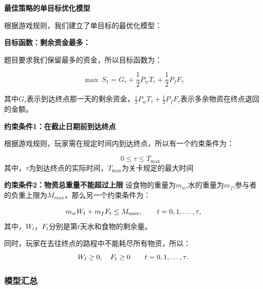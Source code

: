 \noindent{} \textbf{最佳策略的单目标优化模型}

根据游戏规则，我们建立了单目标的最优化模型：

\textbf{目标函数：剩余资金最多：}

题目要求我们保留最多的资金，所以目标函数为：

\[
\max \ S_1
=G_{\tau}+\frac{1}{2}P_wT_{\tau}+\frac{1}{2}P_fF_{\tau}
\]

其中$G_{\tau}$表示到达终点那一天的剩余资金，$\frac{1}{2}P_wT_{\tau}+\frac{1}{2}P_fF_{\tau}$表示多余物资在终点退回的金额。

\textbf{约束条件1：在截止日期前到达终点}

根据游戏规则，玩家需在规定时间内到达终点，所以有一个约束条件为：

\[
\qquad 0\le \tau \le T_{\max}
\]
其中，$\tau$为到达终点的实际时间，$T_{\max}$为关卡规定的最大时间

\textbf{约束条件2：物资总重量不能超过上限}
设食物的重量为$m_w$,水的重量为$m_f$,参与者的负重上限为$M_{max}$，那么另一个约束条件为：

\[
m_wW_t+m_fF_t\le M_{\max}, \qquad t=0,1,\dots,\tau,\\[1mm]
\]
其中，$W_t$，$F_t$分别是第$t$天水和食物的剩余量。

同时，玩家在去往终点的路程中不能耗尽所有物资，所以：
\[
W_t\ge 0,\quad F_t\ge 0 \qquad t=0,1,\dots,\tau.\\[1mm]
\]

\subsubsection{模型汇总}

